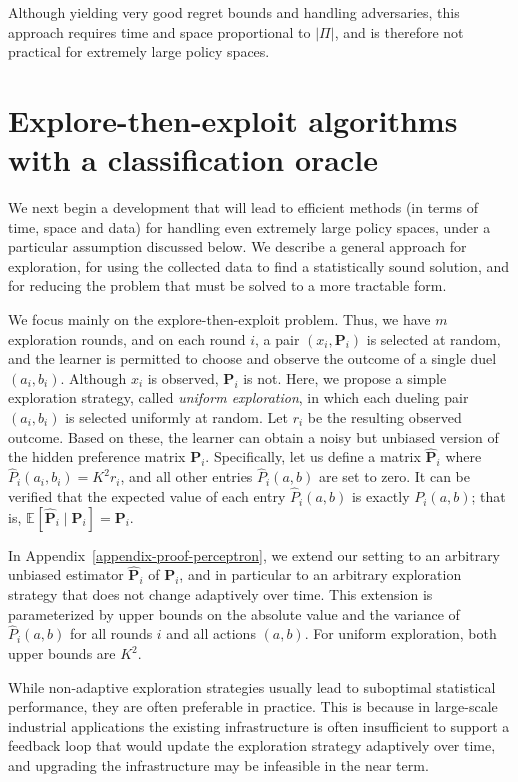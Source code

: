 Although yielding very good regret bounds and handling adversaries, this approach requires time and space proportional to ${|\Pi|}$, and is therefore not practical for extremely large policy spaces.

\section{Explore-then-exploit algorithms with a classification oracle}
\label{sec:explore-first}

We next begin a development that will lead to efficient methods (in terms of time, space and data) for handling even extremely large policy spaces, under a particular assumption discussed below. We describe a general approach for exploration, for using the collected data to find a statistically sound solution, and for reducing the problem that must be solved to a more tractable form.

We focus mainly on the explore-then-exploit problem. Thus, we have $m$ exploration rounds, and on each round $i$, a pair $(x_i,\mathbf{P}_i)$ is selected at random, and the learner is permitted to choose and observe the outcome of a single duel $(a_i,b_i)$. Although $x_i$ is observed, $\mathbf{P}_i$ is not. Here, we propose a simple exploration strategy, called \emph{uniform exploration}, in which each dueling pair $(a_i, b_i)$ is selected uniformly at random. Let $r_i$ be the resulting observed outcome. Based on these, the learner can obtain a noisy but unbiased version of the hidden preference matrix $\mathbf{P}_i$.
Specifically, let us define a matrix ${\mathbf{\hat{P}}_i}$ where ${\hat{P}_i({a_i},{b_i})}=K^2 r_i$, and all other entries ${\hat{P}_i({a},{b})}$ are set to zero. It can be verified that the expected value of each entry
${\hat{P}_i({a},{b})}$ is exactly ${P_i({a},{b})}$; that is,
${\mathbb{E}_{}[{{\mathbf{\hat{P}}_i} \mathbin{\vert} \mathbf{P}_i}]} = \mathbf{P}_i$.

In Appendix~\ref{appendix-proof-perceptron}, we extend our setting to an arbitrary unbiased estimator ${\mathbf{\hat{P}}_i}$ of $\mathbf{P}_i$, and in particular to an arbitrary exploration strategy that does not change adaptively over time. This extension is parameterized by upper bounds on the absolute value and the variance of ${\hat{P}_i({a},{b})}$ for all rounds $i$ and all actions $(a,b)$. For uniform exploration, both upper bounds are $K^2$.

While non-adaptive exploration strategies usually lead to suboptimal statistical performance, they are often preferable in practice. This is because in large-scale industrial applications the existing infrastructure is often insufficient to support a feedback loop that would update the exploration strategy adaptively over time, and upgrading the infrastructure may be infeasible in the near term.

